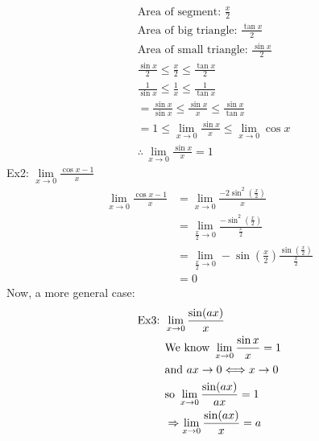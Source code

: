 \documentclass[11pt, fleqn]{article}
\begin{document}
\begin{align*}
    &\text{Area of segment: }\frac{x}{2}\\
    &\text{Area of big triangle: }\frac{\tan x}{2}\\
    &\text{Area of small triangle: } \frac{\sin x}{2}\\
    &\frac{\sin x}{2}\leq\frac{x}{2}\leq\frac{\tan x}{2}\\
    &\frac{1}{\sin x}\leq\frac{1}{x}\leq\frac{1}{\tan x}\\
    &=\frac{\sin x}{\sin x}\leq\frac{\sin x}{x}\leq \frac{\sin x}{\tan x}\\
    &=1\leq\lim_{x\to 0}\frac{\sin x}{x}\leq\lim_{x\to 0}\cos x\\
    &\therefore\,\lim_{x\to 0}\frac{\sin x}{x}=1
\end{align*}
Ex2: $\lim\limits_{x\to 0}\frac{\cos x-1}{x}$
\begin{align*}
    \lim\limits_{x\to 0}\frac{\cos x-1}{x}&=\lim_{x\to 0}\frac{-2\sin^2\left(\frac{x}{2}\right)}{x}\\
    &=\lim_{\frac{x}{2}\to 0}\frac{-\sin^2\left(\frac{x}{2}\right)}{\frac{x}{2}}\\
    &=\lim_{\frac{x}{2}\to 0}-\sin\left(\frac{x}{2}\right)\frac{\sin\left(\frac{x}{2}\right)}{\frac{x}{2}}\\
    &=0
\end{align*}
Now, a more general case:
\begin{align*}
    \text{Ex3: }&\lim_{x\to 0}\frac{\sin(ax)}{x}\\
    &\text{We know }\lim_{x\to 0}\frac{\sin x}{x}=1\\
    &\text{and }ax\to 0\Longleftrightarrow x\to 0\\
    &\text{so }\lim_{x\to 0}\frac{\sin(ax)}{ax}=1\\
    &\Rightarrow\lim_{x\to 0}\frac{\sin(ax)}{x}=a
\end{align*}
\end{document}
